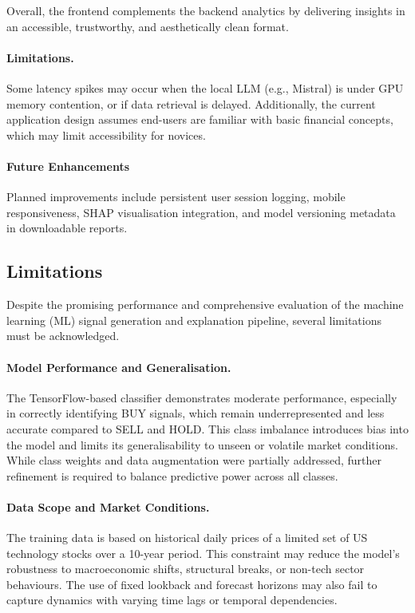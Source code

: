 Overall, the frontend complements the backend analytics by delivering insights in an accessible, trustworthy, and aesthetically clean format.

\paragraph{Limitations.}  
Some latency spikes may occur when the local LLM (e.g., Mistral) is under GPU memory contention, or if data retrieval is delayed. Additionally, the current application design assumes end-users are familiar with basic financial concepts, which may limit accessibility for novices.

\paragraph{Future Enhancements}  
Planned improvements include persistent user session logging, mobile responsiveness, SHAP visualisation integration, and model versioning metadata in downloadable reports.

\subsection{Limitations}

Despite the promising performance and comprehensive evaluation of the machine learning (ML) signal generation and explanation pipeline, several limitations must be acknowledged.

\paragraph{Model Performance and Generalisation.}  
The TensorFlow-based classifier demonstrates moderate performance, especially in correctly identifying BUY signals, which remain underrepresented and less accurate compared to SELL and HOLD. This class imbalance introduces bias into the model and limits its generalisability to unseen or volatile market conditions. While class weights and data augmentation were partially addressed, further refinement is required to balance predictive power across all classes.

\paragraph{Data Scope and Market Conditions.}  
The training data is based on historical daily prices of a limited set of US technology stocks over a 10-year period. This constraint may reduce the model’s robustness to macroeconomic shifts, structural breaks, or non-tech sector behaviours. The use of fixed lookback and forecast horizons may also fail to capture dynamics with varying time lags or temporal dependencies.


